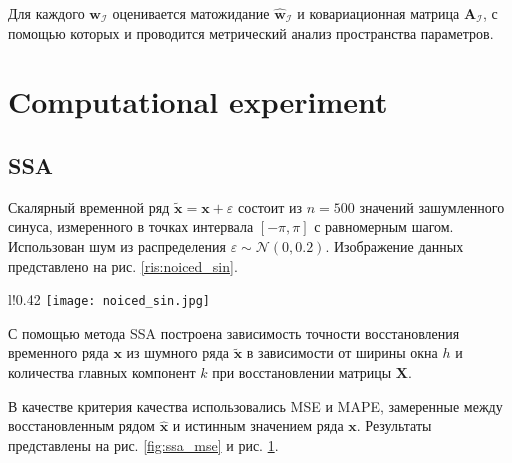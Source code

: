 \documentclass[12pt, twoside]{article}
\begin{document}
Для каждого $\mathbf{w}_{\mathcal{I}}$ оценивается матожидание $\hat{\mathbf{w}}_{\mathcal{I}}$ и ковариационная матрица $\mathbf{A}_{\mathcal{I}}$, с помощью которых и проводится метрический анализ пространства параметров.


\section{Computational experiment}
\subsection{SSA}
Скалярный временной ряд $\mathbf{\tilde{x}} = \mathbf{x} + \varepsilon$ состоит из $n=500$ значений зашумленного синуса, измеренного в точках интервала $[-\pi, \pi]$ с равномерным шагом. Использован шум из распределения $\varepsilon \sim \mathcal{N}(0, 0.2)$. Изображение данных представлено на рис. \ref{ris:noiced_sin}.

\begin{wrapfigure}{l!}{0.42\textwidth}
\texttt{[image: noiced\_sin.jpg]}
\caption{Зашумленный синус.}
\label{ris:noiced_sin}
\end{wrapfigure}

С помощью метода SSA построена зависимость точности восстановления временного ряда $\mathbf{x}$ из шумного ряда $\mathbf{\tilde{x}}$ в зависимости от ширины окна $h$ и количества главных компонент $k$ при восстановлении матрицы $\mathbf{X}$.

В качестве критерия качества использовались MSE и MAPE, замеренные между восстановленным рядом $\mathbf{\hat{x}}$ и истинным значением ряда $\mathbf{x}$. Результаты представлены на рис. \ref{fig:ssa_mse} и рис. \ref{fig:ssa_mape}.

\captionsetup[subfigure]{labelsep=colon, labelformat=parent}

\begin{figure}[ht]%
    \centering
    \label{fig:ssa_mse}%
    \qquad
    \label{fig:ssa_mape}%
\end{figure}
\end{document}
